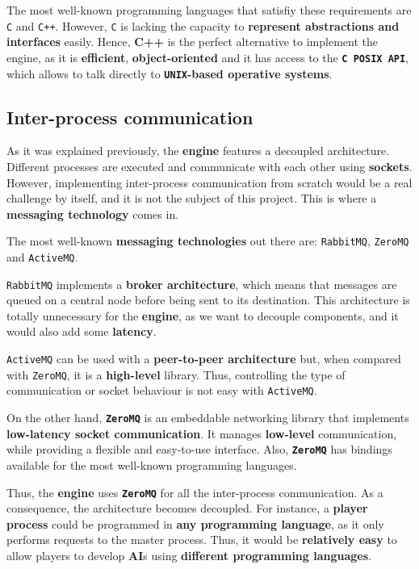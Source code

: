 \documentclass[a4paper,11pt,titlepage,abstract,numbers=noenddot,automark,mnsy,intlimits,rgb,dvipsnames]{report}
\begin{document}
The most well-known programming languages that satisfiy these requirements are \texttt{C} and \texttt{C++}. However, \texttt{C}  is lacking
the capacity to \textbf{represent abstractions and interfaces} easily. Hence, \textbf{C++} is the perfect alternative to implement
the engine, as it is \textbf{efficient}, \textbf{object-oriented} and it has access to the \textbf{\texttt{C POSIX API}}, which allows to talk
directly to \textbf{\texttt{UNIX}-based operative systems}.
\subsection{Inter-process communication}
\indent
As it was explained previously, the \textbf{engine} features a decoupled architecture. Different processes are
executed and communicate with each other using \textbf{sockets}. However, implementing inter-process communication from
scratch would be a real challenge by itself, and it is not the subject of this project. This is where a
\textbf{messaging technology} comes in.

The most well-known \textbf{messaging technologies} out there are: \texttt{RabbitMQ}, \texttt{ZeroMQ} and \texttt{ActiveMQ}.

\texttt{RabbitMQ} implements
a \textbf{broker architecture}, which means that messages are queued on a central node before being sent to its destination.
This architecture is totally unnecessary for the \textbf{engine}, as we want to decouple components, and it would also add
some \textbf{latency}.

\texttt{ActiveMQ} can be used with a \textbf{peer-to-peer architecture} but, when compared with \texttt{ZeroMQ}, it is a
\textbf{high-level} library. Thus, controlling the type of communication or socket behaviour is not easy with \texttt{ActiveMQ}.

On the other hand, \textbf{\texttt{ZeroMQ}} \cite{zeromq} is an embeddable networking library that implements \textbf{low-latency socket communication}. It manages
\textbf{low-level} communication, while providing a flexible and easy-to-use interface. Also, \textbf{\texttt{ZeroMQ}} has bindings available
for the most well-known programming languages.

Thus, the \textbf{engine} uses \textbf{\texttt{ZeroMQ}} for all the inter-process communication. As a consequence, the architecture becomes
decoupled. For instance, a \textbf{player process} could be programmed in \textbf{any programming language}, as it
only performs requests to the master process. Thus, it would be \textbf{relatively easy} to allow players to develop
\textbf{AI}s using \textbf{different programming languages}.
\end{document}
